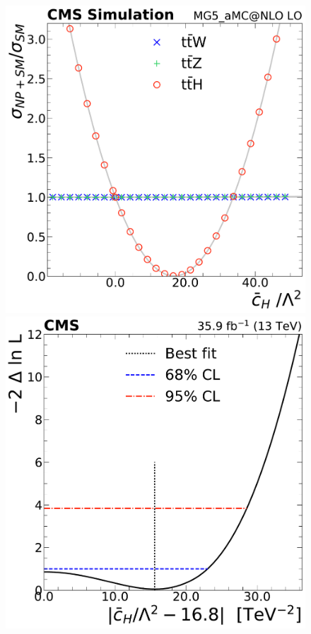 \begin{landscape}
\begin{figure}
{        \includegraphics[height=\textheight]{figures/thirteen-TeV/NP/mu/cH}\hspace{1cm}
        \includegraphics[height=\textheight]{figures/thirteen-TeV/NP/nll/cH}\hspace{1cm}
}
\end{figure}
\end{landscape}
